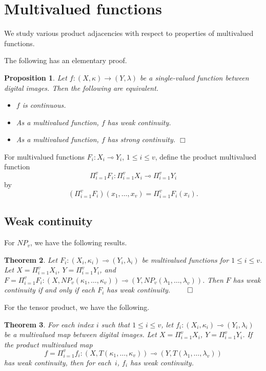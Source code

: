 \documentclass{article}
\theoremstyle{plain}
\newtheorem{thm}{Theorem}
\newtheorem{prop}[thm]{Proposition}
\theoremstyle{definition}
\numberwithin{thm}{section}
\begin{document}
\section{Multivalued functions}
We study various product adjacencies with respect to properties of multivalued functions.

The following has an elementary proof.

\begin{prop}
\label{single-val-as-multi}
Let $f: (X,\kappa) \to (Y, \lambda)$ be a single-valued function between
digital images. Then the following are equivalent.
\begin{itemize}
\item $f$ is continuous.
\item As a multivalued function, $f$ has weak continuity.
\item As a multivalued function, $f$ has strong continuity. $\Box$
\end{itemize}
\end{prop}

For multivalued functions
$F_i: X_i \multimap Y_i$, $1 \leq i \leq v$,
define the product multivalued function
\[ \Pi_{i=1}^v F_i: \Pi_{i=1}^v X_i \multimap \Pi_{i=1}^v Y_i \]
by
\[ (\Pi_{i=1}^v F_i)(x_1,\ldots, x_v) =
   \Pi_{i=1}^v F_i(x_i).
\]

\subsection{Weak continuity}
For $NP_v$, we have the following
results.
\begin{thm}
\label{weak-prod}
\rm{\cite{Boxer16a}}
Let $F_i: (X_i, \kappa_i) \multimap (Y_i,\lambda_i)$ be multivalued functions for $1 \le i \le v$.
Let $X = \Pi_{i=1}^v X_i$, $Y = \Pi_{i=1}^v Y_i$, and $F = \Pi_{i=1}^v F_i: (X, NP_v(\kappa_1,\ldots,\kappa_v)) \multimap (Y, NP_v(\lambda_1,\ldots,\lambda_v))$. Then
$F$ has weak continuity if and only if each 
$F_i$ has weak continuity. $\qed$
\end{thm}

For the tensor product, we have the following.

\begin{thm}
\label{weak-prod-cont-implies-factor}
For each index $i$ such that $1 \le i \le v$,
let $f_i: (X_i,\kappa_i) \multimap (Y_i,\lambda_i)$ be a
multivalued map between digital images.
Let $X=\Pi_{i=1}^v X_i$, $Y=\Pi_{i=1}^v Y_i$.
If the product multivalued map
\[ f=\Pi_{i=1}^v f_i: (X, T(\kappa_1,\ldots,\kappa_v)) \multimap (Y, T(\lambda_1, \ldots, \lambda_v)) \]
has weak continuity, then for each~$i$,
$f_i$ has weak continuity.
\end{thm}
\end{document}
